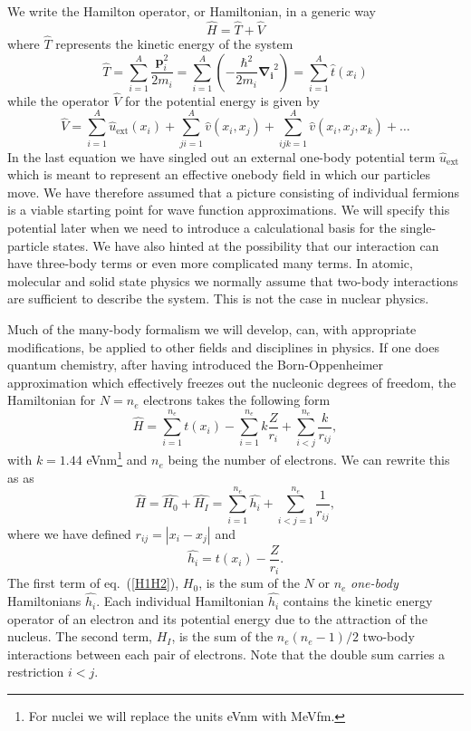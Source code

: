 \begin{itemize}
We write the Hamilton operator, or Hamiltonian,  in a generic way 
\[
	\hat{H} = \hat{T} + \hat{V} 
\]
where $\hat{T}$  represents the kinetic energy of the system
\[
	\hat{T} = \sum_{i=1}^A \frac{\mathbf{p}_i^2}{2m_i} = \sum_{i=1}^A \left( -\frac{\hbar^2}{2m_i} \mathbf{\nabla_i}^2 \right) =
		\sum_{i=1}^A \hat{t}(x_i)
\]
while the operator $\hat{V}$ for the potential energy is given by
\begin{equation}
	\hat{V} = \sum_{i=1}^A \hat{u}_{\mathrm{ext}}(x_i) + \sum_{ji=1}^A \hat{v}(x_i,x_j)+\sum_{ijk=1}^A\hat{v}(x_i,x_j,x_k)+\dots
\label{eq:firstv}
\end{equation}
In the last equation we have singled out an external one-body
potential term $\hat{u}_{\mathrm{ext}}$ which is meant to represent an
effective onebody field in which our particles move. We have therefore
assumed that a picture consisting of individual fermions is a viable
starting point for wave function approximations.  We will specify this
potential later when we need to introduce a calculational basis for
the single-particle states. We have also hinted at the possibility
that our interaction can have three-body terms or even more
complicated many terms.  In atomic, molecular and solid state physics
we normally assume that two-body interactions are sufficient to
describe the system. This is not the case in nuclear physics.

Much of the many-body formalism we will develop, can, with appropriate
modifications, be applied to other fields and disciplines in physics.
If one does quantum chemistry, after having introduced the
Born-Oppenheimer approximation which effectively freezes out the
nucleonic degrees of freedom, the Hamiltonian for $N=n_e$ electrons
takes the following form
\[
  \hat{H} = \sum_{i=1}^{n_e} t(x_i) 
  - \sum_{i=1}^{n_e} k\frac{Z}{r_i} + \sum_{i<j}^{n_e} \frac{k}{r_{ij}},
\]
with $k=1.44$ eVnm\footnote{For nuclei we will replace the units eVnm with MeVfm.} and $n_e$ being the number of electrons. We can rewrite this as
as
\begin{equation}
    \hat{H} = \hat{H_0} + \hat{H_I} 
    = \sum_{i=1}^{n_e}\hat{h_i} + \sum_{i<j=1}^{n_e}\frac{1}{r_{ij}},
\label{H1H2}
\end{equation}
where  we have defined $r_{ij}=| x_i-x_j|$ and
\begin{equation}
  \hat{h_i} =  t(x_i) - \frac{Z}{r_i}.
\label{hi}
\end{equation}
The first term of eq.~(\ref{H1H2}), $H_0$, is the sum of the $N$ or $n_e$
\emph{one-body} Hamiltonians $\hat{h_i}$. Each individual
Hamiltonian $\hat{h_i}$ contains the kinetic energy operator of an
electron and its potential energy due to the attraction of the
nucleus. The second term, $H_I$, is the sum of the $n_e(n_e-1)/2$
two-body interactions between each pair of electrons. Note that the double sum carries a restriction $i<j$.


\end{itemize}
